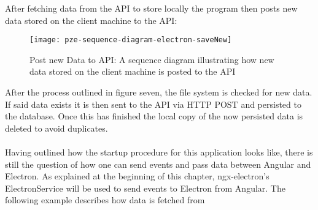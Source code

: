 After fetching data from the API to store locally the program then posts new data stored on the 
client machine to the API:
\begin{figure}[H]
  \centering
  \label{fig:pze-sequence-diagram-electron-saveNew}
  \texttt{[image: pze-sequence-diagram-electron-saveNew]}
  \caption{Post new Data to API:
  A sequence diagram illustrating how new data stored on the client machine is posted to the API}
\end{figure}
After the process outlined in figure seven, the file system is checked for new data. 
If said data exists it is then sent to the API via HTTP POST and persisted to the database.
Once this has finished the local copy of the now persisted data is deleted to avoid duplicates.\paragraph{}
Having outlined how the startup procedure for this application looks like, there is still the question of 
how one can send events and pass data between Angular and Electron.
As explained at the beginning of this chapter, ngx-electron's ElectronService will be used to send events 
to Electron from Angular. 
The following example describes how data is fetched from  